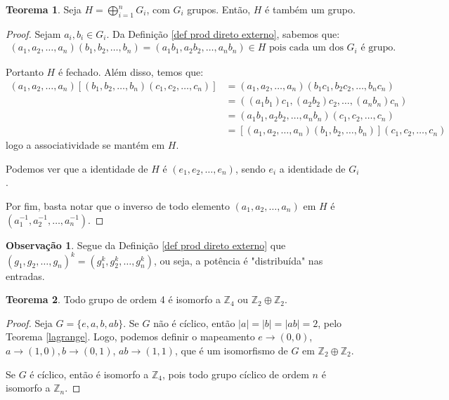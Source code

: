 \documentclass[a4paper,portuguese,11pt,twoside, leqno]{book}
\theoremstyle{definition}
\newtheorem{theorem}{Teorema}[section]
\newtheorem{remark}{Observação}[section]
\begin{document}
	\begin{theorem}
		Seja $\displaystyle{H = \bigoplus_{i=1}^{n}G_i}$, com $G_i$ grupos. Então, $H$ é também um grupo.
	\end{theorem}
	
	\begin{proof}
		Sejam $a_i, b_i\in G_i$. Da Definição \eqref{def prod direto externo}, sabemos que:
		\begin{align*}
		(a_1, a_2, \dots, a_n)(b_1, b_2, \dots, b_n) = (a_1b_1, a_2b_2, \dots, a_nb_n)\in H \text{ pois cada um dos } G_i \text{ é grupo.}
		\end{align*}
		\par Portanto $H$ é fechado. Além disso, temos que:
		\begin{align*}
		(a_1, a_2, \dots, a_n)[(b_1, b_2, \dots, b_n)(c_1, c_2, \dots, c_n)] &= (a_1, a_2, \dots, a_n)(b_1c_1, b_2c_2, \dots, b_nc_n) \\ &= ((a_1b_1)c_1, (a_2b_2)c_2, \dots, (a_nb_n)c_n) \\ &= (a_1b_1, a_2b_2, \dots, a_nb_n)(c_1, c_2, \dots, c_n) \\ &= [(a_1, a_2, \dots, a_n)(b_1, b_2, \dots, b_n)](c_1, c_2, \dots, c_n)
		\end{align*}
		logo a associatividade se mantém em $H$.
		\par\vspace{0.3cm} Podemos ver que a identidade de $H$ é $(e_1, e_2, \dots, e_n)$, sendo $e_i$ a identidade de $G_i$.
		\par\vspace{0.3cm} Por fim, basta notar que o inverso de todo elemento $(a_1, a_2, \dots, a_n)$ em $H$ é $(a_1^{-1}, a_2^{-1}, \dots, a_n^{-1})$.
		
	\end{proof}
	
	\begin{remark}
		Segue da Definição \eqref{def prod direto externo} que $(g_1, g_2, \dots, g_n)^k = (g_1^k, g_2^k, \dots, g_n^k)$, ou seja, a potência é "distribuída" nas entradas.
	\end{remark}
	
	\begin{theorem}
		Todo grupo de ordem 4 é isomorfo a $\mathbb{Z}_4$ ou $\mathbb{Z}_2\oplus\mathbb{Z}_2$.
	\end{theorem}
	
	\begin{proof}
		Seja $G = \{e, a, b, ab\}$. Se $G$ não é cíclico, então $|a| = |b| = |ab| = 2$, pelo Teorema \eqref{lagrange}. Logo, podemos definir o mapeamento $e\to (0,0)$, $a\to (1,0), b\to (0,1)$, $ab\to (1,1)$, que é um isomorfismo de $G$ em $\mathbb{Z}_2\oplus\mathbb{Z}_2$.
		\par\vspace{0.3cm} Se $G$ é cíclico, então é isomorfo a $\mathbb{Z}_4$, pois todo grupo cíclico de ordem $n$ é isomorfo a $\mathbb{Z}_n$. 
		
	\end{proof}
	
\end{document}
